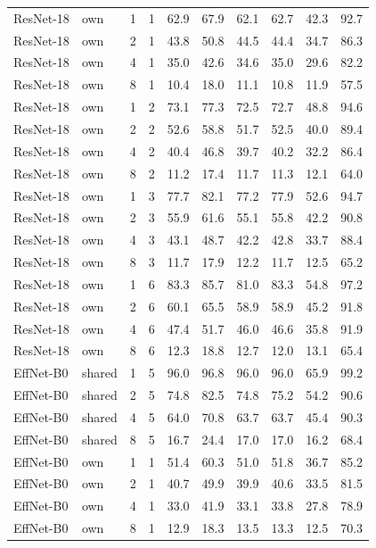 \documentclass[10pt,a4paper]{article}
\begin{document}
\begin{longtable}{llrrrrrrrr}
ResNet-18 & own & 1 & 1 & 62.9 & 67.9 & 62.1 & 62.7 & 42.3 & 92.7 \\
ResNet-18 & own & 2 & 1 & 43.8 & 50.8 & 44.5 & 44.4 & 34.7 & 86.3 \\
ResNet-18 & own & 4 & 1 & 35.0 & 42.6 & 34.6 & 35.0 & 29.6 & 82.2 \\
ResNet-18 & own & 8 & 1 & 10.4 & 18.0 & 11.1 & 10.8 & 11.9 & 57.5 \\
ResNet-18 & own & 1 & 2 & 73.1 & 77.3 & 72.5 & 72.7 & 48.8 & 94.6 \\
ResNet-18 & own & 2 & 2 & 52.6 & 58.8 & 51.7 & 52.5 & 40.0 & 89.4 \\
ResNet-18 & own & 4 & 2 & 40.4 & 46.8 & 39.7 & 40.2 & 32.2 & 86.4 \\
ResNet-18 & own & 8 & 2 & 11.2 & 17.4 & 11.7 & 11.3 & 12.1 & 64.0 \\
ResNet-18 & own & 1 & 3 & 77.7 & 82.1 & 77.2 & 77.9 & 52.6 & 94.7 \\
ResNet-18 & own & 2 & 3 & 55.9 & 61.6 & 55.1 & 55.8 & 42.2 & 90.8 \\
ResNet-18 & own & 4 & 3 & 43.1 & 48.7 & 42.2 & 42.8 & 33.7 & 88.4 \\
ResNet-18 & own & 8 & 3 & 11.7 & 17.9 & 12.2 & 11.7 & 12.5 & 65.2 \\
ResNet-18 & own & 1 & 6 & 83.3 & 85.7 & 81.0 & 83.3 & 54.8 & 97.2 \\
ResNet-18 & own & 2 & 6 & 60.1 & 65.5 & 58.9 & 58.9 & 45.2 & 91.8 \\
ResNet-18 & own & 4 & 6 & 47.4 & 51.7 & 46.0 & 46.6 & 35.8 & 91.9 \\
ResNet-18 & own & 8 & 6 & 12.3 & 18.8 & 12.7 & 12.0 & 13.1 & 65.4 \\
EffNet-B0 & shared & 1 & 5 & 96.0 & 96.8 & 96.0 & 96.0 & 65.9 & 99.2 \\
EffNet-B0 & shared & 2 & 5 & 74.8 & 82.5 & 74.8 & 75.2 & 54.2 & 90.6 \\
EffNet-B0 & shared & 4 & 5 & 64.0 & 70.8 & 63.7 & 63.7 & 45.4 & 90.3 \\
EffNet-B0 & shared & 8 & 5 & 16.7 & 24.4 & 17.0 & 17.0 & 16.2 & 68.4 \\
EffNet-B0 & own & 1 & 1 & 51.4 & 60.3 & 51.0 & 51.8 & 36.7 & 85.2 \\
EffNet-B0 & own & 2 & 1 & 40.7 & 49.9 & 39.9 & 40.6 & 33.5 & 81.5 \\
EffNet-B0 & own & 4 & 1 & 33.0 & 41.9 & 33.1 & 33.8 & 27.8 & 78.9 \\
EffNet-B0 & own & 8 & 1 & 12.9 & 18.3 & 13.5 & 13.3 & 12.5 & 70.3 \\

\end{longtable}
\end{document}
